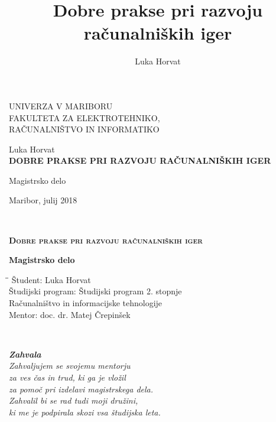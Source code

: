 \documentclass[12pt,a4paper,twoside]{book}
\author{Luka Horvat}
\title{Dobre prakse pri razvoju računalniških iger}
\begin{document}
	
\thispagestyle{empty} 
\begin{center}
	{\large 
		UNIVERZA V MARIBORU\\
		FAKULTETA ZA ELEKTROTEHNIKO,\\
		RAČUNALNIŠTVO IN INFORMATIKO\\
	}
	
	\vspace{\fill}
	{\LARGE Luka Horvat}\\
	
	\vspace{1cm}
	\textsc{\textbf{\LARGE DOBRE PRAKSE PRI RAZVOJU RAČUNALNIŠKIH IGER\\}}
	
	\vspace{1cm}
	{\LARGE Magistrsko delo}
	
	\vfill
	{\Large Maribor, julij 2018}
	\newpage
\end{center}

\ \thispagestyle{empty}
\newpage

\thispagestyle{empty} 
\begin{center}	
	\vspace*{\fill}
	\textsc{\textbf{\LARGE
			Dobre prakse pri razvoju računalniških iger\\
	}}
	{\large\textbf{Magistrsko delo\\}
		
	}
	\vspace{\fill}
	\begin{tabbing}
		\hspace*{4cm}\=\hspace*{3cm}\= \kill
		Študent: \> Luka Horvat\\
		Študijski program: \> Študijski program 2. stopnje\\
		\>Računalništvo in informacijske tehnologije\\
		Mentor: \> doc. dr. Matej Črepinšek
	\end{tabbing}
\end{center}
\newpage

\ \thispagestyle{empty}
\newpage


\mbox{}
{\raggedleft\vfill\itshape%
		\textbf{Zahvala}\\
		Zahvaljujem se svojemu mentorju \\za ves čas in trud, ki ga je vložil \\za pomoč pri izdelavi magistrskega dela. \\
		Zahvalil bi se rad tudi moji družini,\\ki me je podpirala skozi vsa študijska leta.  \\
	}\par
\end{document}
